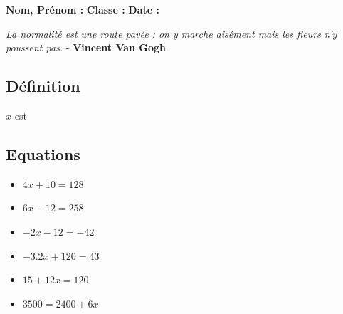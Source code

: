 



\textbf{Nom, Prénom :} \hspace{8cm} \textbf{Classe :} \hspace{3cm} \textbf{Date :}\\
\vspace{-0.8cm}
\begin{center}
  \textit{La normalité est une route pavée : on y marche aisément mais les fleurs n’y poussent pas.} - \textbf{Vincent Van Gogh}
\end{center}
\vspace{-0.8cm}

\subsection*{Définition}

$x$ est \dotfill \\ \Pointilles[1]

\subsection*{Equations}


\begin{multicols}{2}
\begin{itemize}[label={$\bullet$}]
\item $4x + 10 = 128$ \\ \Pointilles[10]  \columnbreak 
\item $6x - 12 = 258$ \\ \Pointilles[10]
\end{itemize} 
\end{multicols}

\begin{multicols}{2}
  \begin{itemize}[label={$\bullet$}]
\item $-2x - 12 = -42$ \\ \Pointilles[10]  \columnbreak 
\item $-3.2x + 120 = 43$ \\ \Pointilles[10]
\end{itemize} 
\end{multicols}

\begin{multicols}{2}
  \begin{itemize}[label={$\bullet$}]
\item $15 + 12x = 120 $ \\ \Pointilles[10]  \columnbreak 
\item $3500 = 2400 + 6x$ \\ \Pointilles[10]
\end{itemize} 
\end{multicols}

